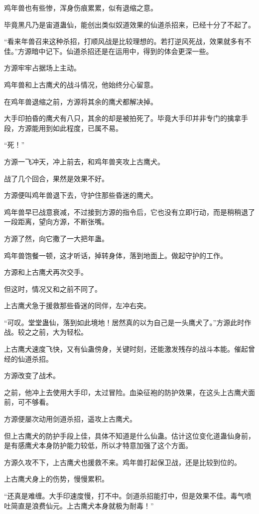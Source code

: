 \begin{this_body}
鸡年兽也有些惨，浑身伤痕累累，似有退缩之意。

毕竟黑凡乃是宙道蛊仙，能创出类似奴道效果的仙道杀招来，已经十分了不起了。

“看来年兽召来这种杀招，打顺风战是比较理想的。若打逆风死战，效果就多有不佳。”方源暗中记下。仙道杀招还是在运用中，得到的体会更深一些。

方源牢牢占据场上主动。

鸡年兽和上古鹰犬的战斗情况，他始终分心留意。

在鸡年兽退缩之前，方源将其余的鹰犬都解决掉。

大手印拍昏的鹰犬有八只，其余的却是被拍死了。毕竟大手印并非专门的擒拿手段，方源能用到如此程度，已属不易。

“死！”

方源一飞冲天，冲上前去，和鸡年兽夹攻上古鹰犬。

战了几个回合，果然是效果不好。

方源便叫鸡年兽退下去，守护住那些昏迷的鹰犬。

鸡年兽早已战意衰减，不过接到方源的指令后，它也没有立即行动，而是稍稍退了一段距离，望向方源，不断张嘴。

方源了然，向它撒了一大把年蛊。

鸡年兽饱餐一顿，这才听话，掉转身体，落到地面上。做起守护的工作。

方源和上古鹰犬再次交手。

但这时，情况又和之前不同了。

上古鹰犬急于援救那些昏迷的同伴，左冲右突。

“可叹。堂堂蛊仙，落到如此境地！居然真的以为自己是一头鹰犬了。”方源此时作战。较之之前，大为轻松。

上古鹰犬速度飞快，又有仙蛊傍身，关键时刻，还能激发残存的战斗本能。催起曾经的仙道杀招。

方源改变了战术。

之前，他冲上去使用大手印，太过冒险。血染征袍的防护效果，在这头上古鹰犬面前，可不够看。

方源便屡次动用剑道杀招，遥攻上古鹰犬。

但上古鹰犬的防护手段上佳，具体不知道是什么仙蛊。估计这位变化道蛊仙身前，是有感鹰犬本身防护能力较低，所以才特意加强了这个方面。

方源久攻不下，上古鹰犬也援救不来。鸡年兽打起保卫战，还是比较到位的。

上古鹰犬身上的伤势，慢慢累积。

“还真是难缠。大手印速度慢，打不中。剑道杀招能打中，但是效果不佳。毒气喷吐简直是浪费仙元。上古鹰犬本身就极为耐毒！”


\end{this_body}
